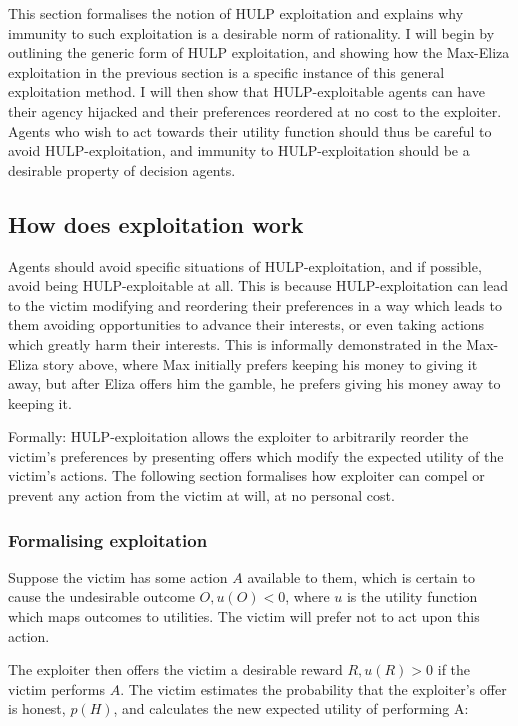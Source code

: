 \documentclass{article}
\begin{document}
This section formalises the notion of HULP exploitation and explains why immunity to such exploitation is a desirable norm of rationality. I will begin by outlining the generic form of HULP exploitation, and showing how the Max-Eliza exploitation in the previous section is a specific instance of this general exploitation method. I will then show that HULP-exploitable agents can have their agency hijacked and their preferences reordered at no cost to the exploiter. Agents who wish to act towards their utility function should thus be careful to avoid HULP-exploitation, and immunity to HULP-exploitation should be a desirable property of decision agents.

\subsection{How does exploitation work}

Agents should avoid specific situations of HULP-exploitation, and if possible, avoid being HULP-exploitable at all. This is because HULP-exploitation can lead to the victim modifying and reordering their preferences in a way which leads to them avoiding opportunities to advance their interests, or even taking actions which greatly harm their interests. This is informally demonstrated in the Max-Eliza story above, where Max initially prefers keeping his money to giving it away, but after Eliza offers him the gamble, he prefers giving his money away to keeping it.

Formally: HULP-exploitation allows the exploiter to arbitrarily reorder the victim's preferences by presenting offers which modify the expected utility of the victim's actions. The following section formalises how exploiter can compel or prevent any action from the victim at will, at no personal cost. 

\subsubsection{Formalising exploitation}

Suppose the victim has some action \(A\) available to them, which is certain to cause the undesirable outcome \(O, u(O) < 0\), where \(u\) is the utility function which maps outcomes to utilities. The victim will prefer not to act upon this action.

The exploiter then offers the victim a desirable reward \(R, u(R) > 0\) if the victim performs \(A\). The victim estimates the probability that the exploiter's offer is honest, \(p(H)\), and calculates the new expected utility of performing A:
\end{document}
